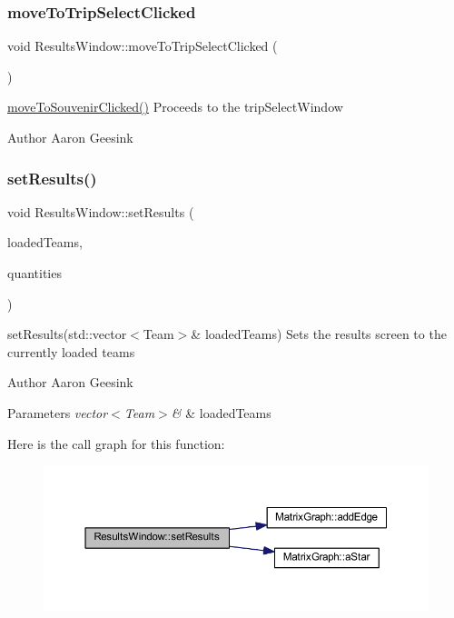 \subsubsection{\texorpdfstring{moveToTripSelectClicked}{moveToTripSelectClicked}}
{\footnotesize\ttfamily void Results\+Window\+::move\+To\+Trip\+Select\+Clicked (\begin{DoxyParamCaption}{ }\end{DoxyParamCaption})\hspace{0.3cm}{\ttfamily [signal]}}



\mbox{\hyperlink{class_results_window_aad8d4563c0f82eb6b91e90fd755532a2}{move\+To\+Souvenir\+Clicked()}} Proceeds to the trip\+Select\+Window 

\begin{DoxyAuthor}{Author}
Aaron Geesink 
\end{DoxyAuthor}
\mbox{\label{class_results_window_a0b6b87c53306edc985aa988a6816369a}} 
\subsubsection{\texorpdfstring{setResults()}{setResults()}}
{\footnotesize\ttfamily void Results\+Window\+::set\+Results (\begin{DoxyParamCaption}\item[{std\+::vector$<$ \mbox{\hyperlink{class_team}{Team}} $>$ \&}]{loaded\+Teams,  }\item[{std\+::vector$<$ int $>$}]{quantities }\end{DoxyParamCaption})}



set\+Results(std\+::vector$<$\+Team$>$\& loaded\+Teams) Sets the results screen to the currently loaded teams 

\begin{DoxyAuthor}{Author}
Aaron Geesink 
\end{DoxyAuthor}

\begin{DoxyParams}{Parameters}
{\em vector$<$\+Team$>$\&} & loaded\+Teams \\
\hline
\end{DoxyParams}
Here is the call graph for this function\+:
\nopagebreak
\begin{figure}[H]
\begin{center}
\leavevmode
\includegraphics[width=350pt]{class_results_window_a0b6b87c53306edc985aa988a6816369a_cgraph}
\end{center}
\end{figure}


